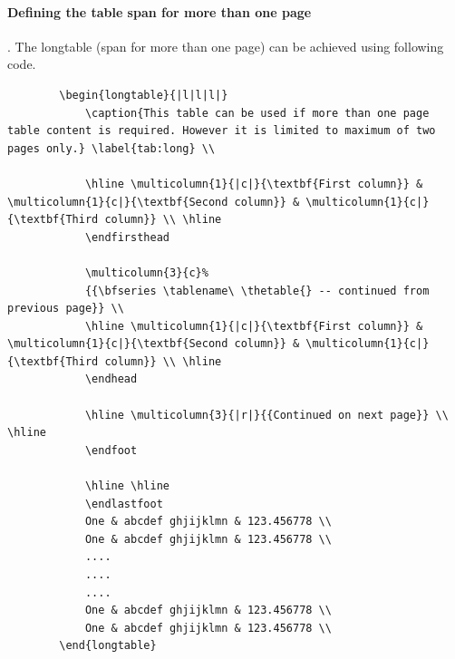 \paragraph{Defining the table span for more than one page}. 
The longtable (span for more than one page) can be achieved using following code. 
{\scriptsize
	\begin{verbatim}
		\begin{longtable}{|l|l|l|}
			\caption{This table can be used if more than one page table content is required. However it is limited to maximum of two pages only.} \label{tab:long} \\
			
			\hline \multicolumn{1}{|c|}{\textbf{First column}} & \multicolumn{1}{c|}{\textbf{Second column}} & \multicolumn{1}{c|}{\textbf{Third column}} \\ \hline 
			\endfirsthead
			
			\multicolumn{3}{c}%
			{{\bfseries \tablename\ \thetable{} -- continued from previous page}} \\
			\hline \multicolumn{1}{|c|}{\textbf{First column}} & \multicolumn{1}{c|}{\textbf{Second column}} & \multicolumn{1}{c|}{\textbf{Third column}} \\ \hline 
			\endhead
			
			\hline \multicolumn{3}{|r|}{{Continued on next page}} \\ \hline
			\endfoot
			
			\hline \hline
			\endlastfoot
			One & abcdef ghjijklmn & 123.456778 \\
			One & abcdef ghjijklmn & 123.456778 \\
			....
			....
			....
			One & abcdef ghjijklmn & 123.456778 \\
			One & abcdef ghjijklmn & 123.456778 \\
		\end{longtable}
	\end{verbatim}
}

